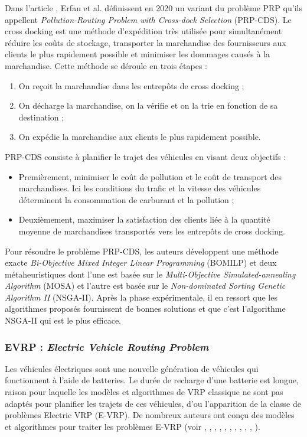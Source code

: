 Dans l'article \cite{PRP_Erfan_2020}, Erfan et al. définissent en 2020 un variant du problème PRP qu'ils appellent \textit{Pollution-Routing Problem with Cross-dock Selection} (PRP-CDS).
Le cross docking est une méthode d'expédition très utilisée pour simultanément réduire les coûts de stockage, transporter la marchandise des fournisseurs aux clients le plus rapidement possible et minimiser les dommages causés à la marchandise. Cette méthode se déroule en trois étapes :
\begin{enumerate}
	
\item On reçoit la marchandise dans les entrepôts de cross docking ;
 \item On décharge la marchandise, on la vérifie et on la trie en fonction de sa destination ;
\item On expédie la marchandise aux clients le plus rapidement possible.
\end{enumerate}
PRP-CDS consiste à planifier le trajet des véhicules en visant deux objectifs :

\begin{itemize}[label=$\square$]

\item Premièrement, minimiser le coût de pollution et le coût de transport des marchandises. Ici les conditions du trafic et la vitesse des véhicules déterminent la consommation de carburant et la pollution ;
\item Deuxièmement, maximiser la satisfaction des clients liée à la quantité moyenne de marchandises transportés vers les entrepôts de cross docking.
\end{itemize}
Pour résoudre le problème PRP-CDS, les auteurs développent une méthode exacte \textit{Bi-Objective Mixed Integer Linear Programming} (BOMILP) et deux métaheuristiques dont l'une est basée sur le \textit{Multi-Objective Simulated-annealing Algorithm} (MOSA) et l'autre est basée sur le \textit{Non-dominated Sorting Genetic Algorithm II} (NSGA-II). Après la phase expérimentale, il en ressort que les algorithmes proposés fournissent de bonnes solutions et que c'est l'algorithme NSGA-II qui est le plus efficace.


\subsubsection{EVRP : \textit{Electric Vehicle Routing Problem}}
Les véhicules électriques sont une nouvelle génération de véhicules qui fonctionnent à l'aide de batteries. Le durée de recharge d'une batterie est longue, raison pour laquelle les modèles et algorithmes de VRP classique ne sont pas adaptés pour planifier les trajets de ces véhicules, d'ou l'apparition de la classe de problèmes Electric VRP (E-VRP). De nombreux auteurs ont conçu des modèles et algorithmes pour traiter les problèmes E-VRP (voir \cite{EVRP_Sina_2020}, \cite{EVRP_Rui_2020}, \cite{article_GVRP3}, \cite{EVRP_Rasoul_2020}, \cite{EVRP_Surendra_2020}, \cite{EVRP_Kexing_2020}, \cite{EVRP_Ji_2020}, \cite{article_RVRP1}, \cite{article_HVRP4}, \cite{EVRP_Shuai_2020}, \cite{article_GVRP1}).

